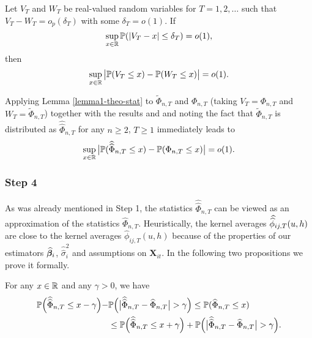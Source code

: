 \documentclass[a4paper,12pt]{article}
\makeatletter
\renewcommand{\eqref}[1]{\tagform@{\ref{#1}}}
\newcommand{\doublehat}[1]{\skew{5.5}\widehat{\widehat{#1}}}
\newcommand{\doublehattwo}[1]{\widehat{\widehat{#1}}}
\makeatother
\begin{document}
\begin{lemmaA}{\cite{KhismatullinaVogt2020}}\label{lemma1-theo-stat}
Let $V_T$ and $W_T$ be real-valued random variables for $T = 1,2,\ldots$ such that $V_T - W_T = o_p(\delta_T)$ with some $\delta_T = o(1)$. If 
\begin{equation*}
\sup_{x \in \mathbb{R}} \mathbb{P}(|V_T - x| \le \delta_T) = o(1), 
\end{equation*}
then 
\begin{equation*}
\sup_{x \in \mathbb{R}} \big| \mathbb{P}(V_T \le x) - \mathbb{P}(W_T \le x) \big| = o(1). 
\end{equation*}
\end{lemmaA}

Applying Lemma \ref{lemma1-theo-stat} to $\widetilde{\Phi}_{n, T}$ and $\Phi_{n,T}$ (taking $V_T = \Phi_{n,T}$ and $W_T = \widetilde{\Phi}_{n, T}$) together with the results \eqref{eq-strong-approx-equality} and \eqref{eqA:anticon} and noting the fact that $\widetilde{\Phi}_{n, T}$ is distributed as $\doublehattwo{\Phi}_{n, T}$ for any $n \ge 2$, $T \ge 1$ immediately leads to
\begin{equation}\label{eqA:intermediate:gaussian}
\sup_{x \in \reals} \big| \pr(\doublehattwo{\Phi}_{n, T} \le x) - \pr(\Phi_{n,T} \le x) \big| = o(1). 
\end{equation}

\subsubsection*{Step 4}


As was already mentioned in Step 1, the statistics $\doublehattwo{\Phi}_{n,T}$ can be viewed as an approximation of the statistics $\widehat{\Phi}_{n,T}$. Heuristically, the kernel averages $\doublehat{\phi}_{ij,T}(u,h)$ are close to the kernel averages $\widehat{\phi}_{ij,T}(u,h)$ because of the properties of our estimators $\widehat{\bm{\beta}}_i$, $\doublehattwo{\sigma}_i^2$ and assumptions on $\mathbf{X}_{it}$. In the following two propositions we prove it formally.

\begin{propA}\label{propA:intermediate1}
For any $x \in \mathbb{R}$ and any $\gamma > 0$, we have
\begin{align}\label{eq-intermediate-relation-1}
\begin{split}\pr\Big(\doublehattwo{\Phi}_{n,T} \le x - \gamma\Big) -& \pr \Big(\big|\doublehattwo{\Phi}_{n,T} - \widehat{\Phi}_{n,T}\big| > \gamma \Big)\le \pr(\widehat{\Phi}_{n, T} \le x) \\
&\le\pr\Big(\doublehattwo{\Phi}_{n,T} \le x + \gamma\Big) + \pr \Big(\big|\doublehattwo{\Phi}_{n,T} - \widehat{\Phi}_{n,T}\big| > \gamma \Big).
\end{split}
\end{align}
\end{propA}
\end{document}
